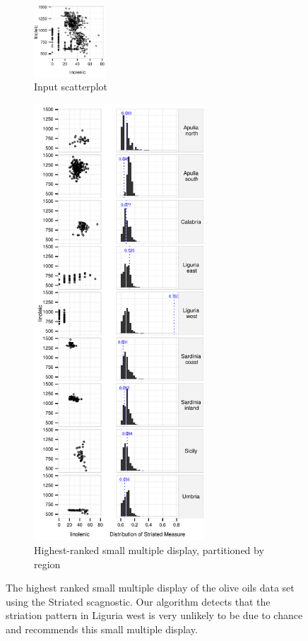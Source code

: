 \begin{figure}[t]
 \centering
    \begin{subfigure}{1.05in}
	\includegraphics[width=1.05in]{images/linolenic-linoleic.pdf}
	  \caption{Input scatterplot}
	 \label{fig:vrich_all}
    \end{subfigure}
    \begin{subfigure}{2.5in}
	\includegraphics[width=2.5in]{images/15_729035813077-region.pdf}
	  \caption{Highest-ranked small multiple display, partitioned by region}
	 \label{fig:vrich_sm}
    \end{subfigure}
	\caption{The highest ranked small multiple display of the olive oils data set using the Striated scagnostic. Our algorithm detects that the striation pattern in Liguria west is very unlikely to be due to chance and recommends this small multiple display. }
\end{figure}

